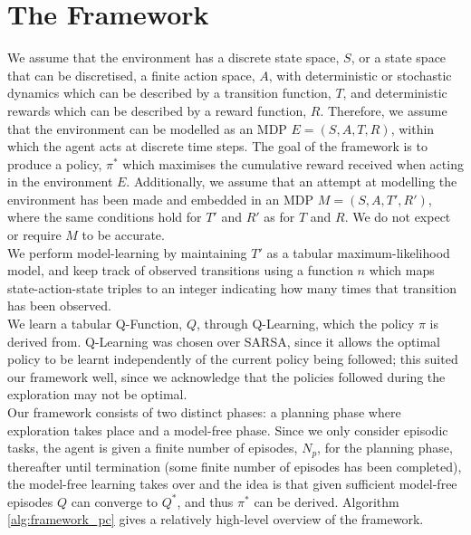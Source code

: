 \section{The Framework}
We assume that the environment has a discrete state space, $S$, or a state space that can be discretised, a finite action space, $A$, with deterministic or stochastic dynamics which can be described by a transition function, $T$, and deterministic rewards which can be described by a reward function, $R$. Therefore, we assume that the environment can be modelled as an MDP $E = (S, A, T, R)$, within which the agent acts at discrete time steps. The goal of the framework is to produce a policy, $\pi^*$ which maximises the cumulative reward received when acting in the environment $E$.
Additionally, we assume that an attempt at modelling the environment has been made and embedded in an MDP $M = (S, A, T', R')$, where the same conditions hold for $T'$ and $R'$ as for $T$ and $R$. We do not expect or require $M$ to be accurate. 
\\We perform model-learning by maintaining $T'$ as a tabular maximum-likelihood model, and keep track of observed transitions using a function $n$ which maps state-action-state triples to an integer indicating how many times that transition has been observed.
\\We learn a tabular Q-Function, $Q$, through Q-Learning, which the policy $\pi$ is derived from. Q-Learning was chosen over SARSA, since it allows the optimal policy to be learnt independently of the current policy being followed; this suited our framework well, since we acknowledge that the policies followed during the exploration may not be optimal.
\\Our framework consists of two distinct phases: a planning phase where exploration takes place and a model-free phase. Since we only consider episodic tasks, the agent is given a finite number of episodes, $N_p$, for the planning phase, thereafter until termination (some finite number of episodes has been completed), the model-free learning takes over and the idea is that given sufficient model-free episodes $Q$ can converge to $Q^*$, and thus $\pi^*$ can be derived. Algorithm \ref{alg:framework_pc} gives a relatively high-level overview of the framework.

